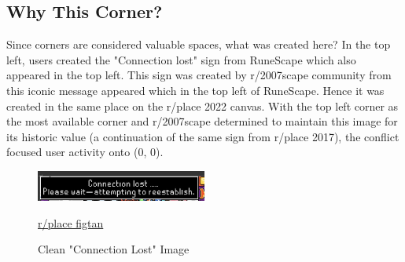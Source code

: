 \subsection{Why This Corner?}

Since corners are considered valuable spaces, what was created here? In the top left, users created the "Connection lost" sign from RuneScape which also appeared in the top left. This sign was created by r/2007scape community from this iconic message appeared which in the top left of RuneScape. Hence it was created in the same place on the r/place 2022 canvas. With the top left corner as the most available corner and r/2007scape determined to maintain this image for its historic value (a continuation of the same sign from r/place 2017), the conflict focused user activity onto (0, 0).

\begin{figure}[H]
\centering
\includegraphics[width=0.5\textwidth]{visuals/connection_lost}
    \caption{Clean "Connection Lost" Image}
    \href{https://www.reddit.com/r/place/comments/tukrrl/the_connection_lost_banner_what_is_this_anyway/}{r/place figtan}
\end{figure}
